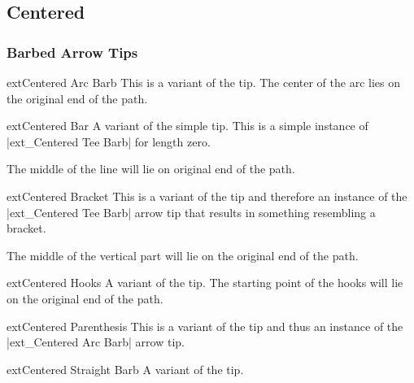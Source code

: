 \begin{multicols}{2}
\subsection{Centered}
\subsubsection{Barbed Arrow Tips}
\begin{arrowtipsimple}{ext\textunderscore Centered Arc Barb}\tipcompat
    This is a variant of the  tip.
    The center of the arc lies on the original end of the path.
\end{arrowtipsimple}

\begin{arrowtipsimple}{ext\textunderscore Centered Bar}\tipcompat
    A variant of the simple  tip.
    This is a simple instance of |ext_Centered Tee Barb| for length zero.
    
    The middle of the line will lie on original end of the path.
\end{arrowtipsimple}

\begin{arrowtipsimple}{ext\textunderscore Centered Bracket}\tipcompat
    This is a variant of the  tip and
    therefore an instance of the |ext_Centered Tee Barb| arrow tip that results in something
    resembling a bracket.
    
    The middle of the vertical part will lie on the original end of the path.
\end{arrowtipsimple}

\begin{arrowtipsimple}{ext\textunderscore Centered Hooks}\tipcompat
    A variant of the  tip.
    The starting point of the hooks will lie on the original end of the path.
\end{arrowtipsimple}

\begin{arrowtipsimple}{ext\textunderscore Centered Parenthesis}\tipcompat
    This is a variant of the  tip and
    thus an instance of the |ext_Centered Arc Barb| arrow tip.
\end{arrowtipsimple}

\begin{arrowtipsimple}{ext\textunderscore Centered Straight Barb}\tipcompat
    A variant of the  tip.
\end{arrowtipsimple}


\end{multicols}

